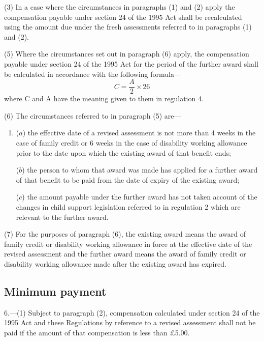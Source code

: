 \documentclass[12pt,a4paper]{article}
\begin{document}
(3) In a case where the circumstances in paragraphs (1) and (2) apply the compensation payable under section 24 of the 1995 Act shall be recalculated using the amount due under the fresh assessments referred to in paragraphs (1) and (2).

(5) Where the circumstances set out in paragraph (6) apply, the compensation payable under section 24 of the 1995 Act for the period of the further award shall be calculated in accordance with the following formula—
\[C = \frac{A}{2} \times 26\]
where C and A have the meaning given to them in regulation 4.

(6) The circumstances referred to in paragraph (5) are—
\begin{enumerate}\item[]
($a$) the effective date of a revised assessment is not more than 4 weeks in the case of family credit or 6 weeks in the case of disability working allowance prior to the date upon which the existing award of that benefit ends;

($b$) the person to whom that award was made has applied for a further award of that benefit to be paid from the date of expiry of the existing award;

($c$) the amount payable under the further award has not taken account of the changes in child support legislation referred to in regulation 2 which are relevant to the further award.
\end{enumerate}

(7) For the purposes of paragraph (6), the existing award means the award of family credit or disability working allowance in force at the effective date of the revised assessment and the further award means the award of family credit or disability working allowance made after the existing award has expired.


\subsection[6. Minimum payment]{Minimum payment}

6.—(1) Subject to paragraph (2), compensation calculated under section 24 of the 1995 Act and these Regulations by reference to a revised assessment shall not be paid if the amount of that compensation is less than £5.00.
\end{document}
